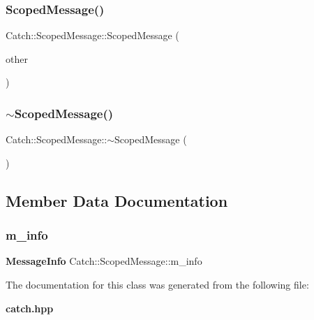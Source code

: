 \mbox{\label{class_catch_1_1_scoped_message_ae03a17fd47220d563d4abc73e7518e29}} 
\subsubsection{Scoped\+Message()\hspace{0.1cm}{\footnotesize\ttfamily [2/2]}}
{\footnotesize\ttfamily Catch\+::\+Scoped\+Message\+::\+Scoped\+Message (\begin{DoxyParamCaption}\item[{\textbf{ Scoped\+Message} const \&}]{other }\end{DoxyParamCaption})}

\mbox{\label{class_catch_1_1_scoped_message_a43190843f9eeb84a0b42b0bc95fdf93a}} 
\subsubsection{$\sim$\+Scoped\+Message()}
{\footnotesize\ttfamily Catch\+::\+Scoped\+Message\+::$\sim$\+Scoped\+Message (\begin{DoxyParamCaption}{ }\end{DoxyParamCaption})}



\subsection{Member Data Documentation}
\mbox{\label{class_catch_1_1_scoped_message_ae6e1476f389cc6e1586f033b3747b27b}} 
\subsubsection{m\+\_\+info}
{\footnotesize\ttfamily \textbf{ Message\+Info} Catch\+::\+Scoped\+Message\+::m\+\_\+info}



The documentation for this class was generated from the following file\+:\begin{DoxyCompactItemize}
\item 
\textbf{ catch.\+hpp}\end{DoxyCompactItemize}
